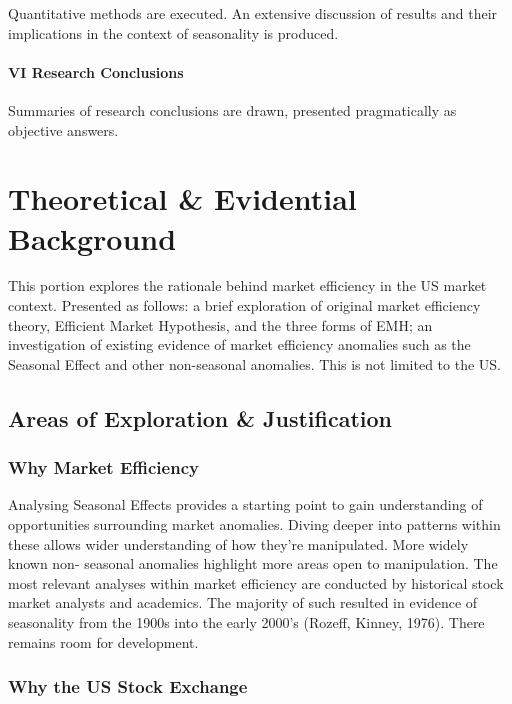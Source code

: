\documentclass[11pt, english]{article}
\begin{document}
		Quantitative methods are executed. An extensive discussion of results and their implications in the context of seasonality is produced.

		\paragraph*{VI Research Conclusions}

		Summaries of research conclusions are drawn, presented pragmatically as objective answers.

\newpage

	\section{Theoretical \& Evidential Background}\label{ch2}

	This portion explores the rationale behind market efficiency in the US market context. Presented as follows: a brief exploration of original market efficiency theory, Efficient Market Hypothesis, and the three forms of EMH; an investigation of existing evidence of market efficiency anomalies such as the Seasonal Effect and other non-seasonal anomalies. This is not limited to the US.

	\subsection{Areas of Exploration \& Justification}

		\subsubsection{Why Market Efficiency}

		Analysing Seasonal Effects provides a starting point to gain understanding of opportunities surrounding market anomalies. Diving deeper into patterns within these allows wider understanding of how they’re manipulated. More widely known non- seasonal anomalies highlight more areas open to manipulation. The most relevant analyses within market efficiency are conducted by historical stock market analysts and academics. The majority of such resulted in evidence of seasonality from the 1900s into the early 2000’s (Rozeff, Kinney, 1976). There remains room for development.

		\subsubsection{Why the US Stock Exchange}
	
\end{document}

